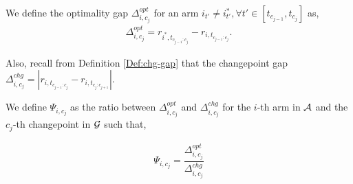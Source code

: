 \begin{definition}
\label{Def:opt-gap}
We define the optimality gap $\Delta^{opt}_{i,c_j}$ for an arm $i_{t'}\neq i^*_{t'},\forall t'\in[t_{c_{j-1}},t_{c_j}]$ as,
\begin{align*}
\Delta^{opt}_{i,c_j}= r_{i^*,t_{c_{j-1}:c_j}}-r_{i,t_{c_{j-1}:c_j}}.
\end{align*}
\end{definition}

Also, recall from Definition \ref{Def:chg-gap} that the changepoint gap $\Delta^{chg}_{i,c_j}=|r_{i,t_{c_{j-1}:c_j}}-r_{i,t_{c_j:c_{j+1}}}|$.



\begin{definition}
\label{Def:ratio}
We define $\Psi_{i,c_j}$ as the ratio between $\Delta^{opt}_{i,c_j}$ and $\Delta^{chg}_{i,c_j}$ for the $i$-th arm in $\mathcal{A}$ and the $c_j$-th changepoint in $\mathcal{G}$ such that,

\begin{align*}
\Psi_{i,c_j} = \dfrac{\Delta^{opt}_{i,c_{j}}}{\Delta^{chg}_{i,c_j}}
\end{align*}

\end{definition}

 
